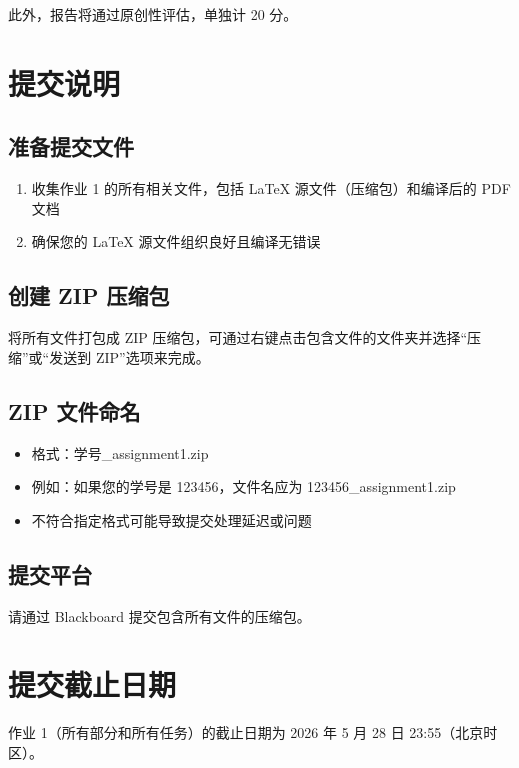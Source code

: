 \documentclass[UTF8]{article}
\begin{document}
此外，报告将通过原创性评估，单独计 20 分。

\section{提交说明}

\subsection{准备提交文件}

\begin{enumerate}
    \item 收集作业 1 的所有相关文件，包括 LaTeX 源文件（压缩包）和编译后的 PDF 文档
    \item 确保您的 LaTeX 源文件组织良好且编译无错误
\end{enumerate}

\subsection{创建 ZIP 压缩包}

将所有文件打包成 ZIP 压缩包，可通过右键点击包含文件的文件夹并选择``压缩''或``发送到 ZIP''选项来完成。

\subsection{ZIP 文件命名}

\begin{itemize}
    \item 格式：学号\_assignment1.zip
    \item 例如：如果您的学号是 123456，文件名应为 123456\_assignment1.zip
    \item 不符合指定格式可能导致提交处理延迟或问题
\end{itemize}

\subsection{提交平台}

请通过 Blackboard 提交包含所有文件的压缩包。

\section{提交截止日期}

作业 1（所有部分和所有任务）的截止日期为 2026 年 5 月 28 日 23:55（北京时区）。

\newpage
\end{document}
